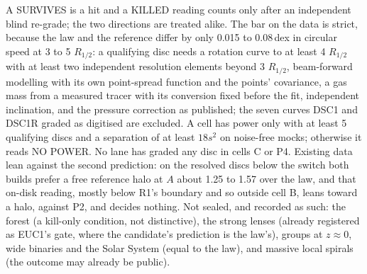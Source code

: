 \documentclass[10pt]{article}
\begin{document}
A SURVIVES is a hit and a KILLED reading counts only after an independent blind re-grade; the two directions are treated alike. The bar on the data is strict, because the law and the reference differ by only 0.015 to 0.08\,dex in circular speed at 3 to 5 $R_{1/2}$: a qualifying disc needs a rotation curve to at least 4 $R_{1/2}$ with at least two independent resolution elements beyond 3 $R_{1/2}$, beam-forward modelling with its own point-spread function and the points' covariance, a gas mass from a measured tracer with its conversion fixed before the fit, independent inclination, and the pressure correction as published; the seven curves DSC1 and DSC1R graded as digitised are excluded. A cell has power only with at least 5 qualifying discs and a separation of at least $18s^2$ on noise-free mocks; otherwise it reads NO POWER. No lane has graded any disc in cells C or P4. Existing data lean against the second prediction: on the resolved discs below the switch both builds prefer a free reference halo at $A$ about 1.25 to 1.57 over the law, and that on-disk reading, mostly below R1's boundary and so outside cell B, leans toward a halo, against P2, and decides nothing. Not sealed, and recorded as such: the forest (a kill-only condition, not distinctive), the strong lenses (already registered as EUC1's gate, where the candidate's prediction is the law's), groups at $z\approx0$, wide binaries and the Solar System (equal to the law), and massive local spirals (the outcome may already be public).
\end{document}
